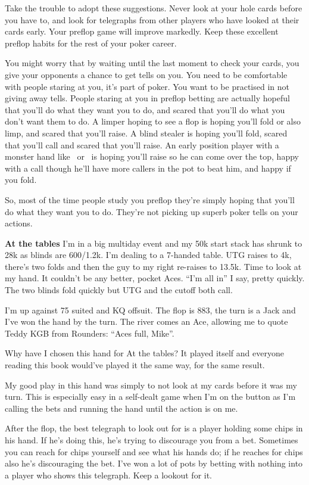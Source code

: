 Take the trouble to adopt these suggestions. Never look at your hole
cards before you have to, and look for telegraphs from other players
who have looked at their cards early. Your preflop game will
improve markedly. Keep these excellent preflop habits
for the rest of your poker career.

You might worry that by waiting until the last moment to check your
cards, you give your opponents a chance to get tells on you.
You need to be comfortable with people staring at you, it's part of
poker. You want to be practised in not giving away tells. People
staring at you in preflop betting are actually hopeful that you'll do
what they want you to do, and scared that you'll do what you don't
want them to do. A limper hoping to see a flop is hoping you'll fold
or also limp, and scared that you'll raise. A blind stealer is hoping
you'll fold, scared that you'll call and scared that you'll
raise. An early position player with a monster hand like \Kc\Ks\ or
\Ad\Kd\ is hoping you'll raise so he can come over the top, happy with
a call though he'll have more callers in the pot to beat him, and
happy if you fold.

So, most of the time people study you preflop they're simply
hoping that you'll do what they want you to do. They're not picking up
superb poker tells on your actions.

\textbf{At the tables} I'm in a big multiday event and my 50k start
stack has shrunk to 28k as blinds are 600/1.2k. I'm dealing to a
7-handed table. UTG raises to 4k, there's two folds and then the guy
to my right re-raises to 13.5k. Time to look at my hand. It couldn't
be any better, pocket Aces. ``I'm all in'' I say, pretty quickly. The
two blinds fold quickly but UTG and the cutoff both call.

I'm up against 75 suited and KQ offsuit. The flop is 883, the turn is
a Jack and I've won the hand by the turn. The river comes an Ace,
allowing me to quote Teddy KGB from Rounders: ``Aces full, Mike''.

Why have I chosen this hand for At the tables? It played itself and
everyone reading this book would've played it the same way, for the
same result.

My good play in this hand was simply to not look at my cards before it
was my turn. This is especially easy in a self-dealt game when I'm on
the button as I'm calling the bets and running the hand until the
action is on me.

After the flop, the best telegraph to look out for is a player
holding some chips in his hand. If he's doing this, he's trying
to discourage you from a bet. Sometimes you can reach for chips
yourself and see what his hands do; if he reaches for chips also
he's discouraging the bet. I've won a lot of pots by betting
with nothing into a player who shows this telegraph. Keep a
lookout for it.

